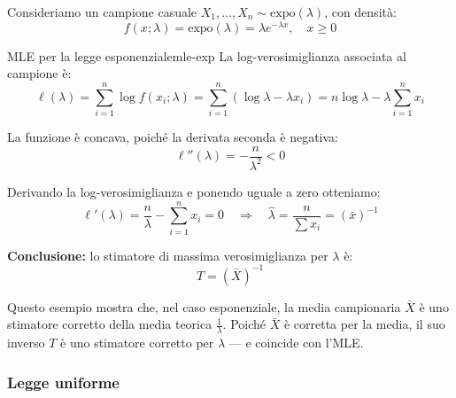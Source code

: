 Consideriamo un campione casuale \( X_1, \dots, X_n \sim \mathrm{expo}(\lambda) \), con densità:
\[
    f(x;\lambda) = \mathrm{expo}(\lambda) = \lambda e^{-\lambda x}, \quad x \geq 0
\]

\begin{esempio}{MLE per la legge esponenziale}{mle-exp}
La log-verosimiglianza associata al campione è:
\[
\ell(\lambda) = \sum_{i=1}^n \log f(x_i; \lambda) = \sum_{i=1}^n \left( \log \lambda - \lambda x_i \right)
= n \log \lambda - \lambda \sum_{i=1}^n x_i
\]

La funzione è concava, poiché la derivata seconda è negativa:
\[
\ell''(\lambda) = -\frac{n}{\lambda^2} < 0
\]

Derivando la log-verosimiglianza e ponendo uguale a zero otteniamo:
\[
\ell'(\lambda) = \frac{n}{\lambda} - \sum_{i=1}^n x_i = 0
\quad \Rightarrow \quad
\hat{\lambda} = \frac{n}{\sum x_i} = \left( \bar{x} \right)^{-1}
\]

\medskip
\textbf{Conclusione:} lo stimatore di massima verosimiglianza per \( \lambda \) è:
\[
T = \left( \bar{X} \right)^{-1}
\]

Questo esempio mostra che, nel caso esponenziale, la media campionaria \( \bar{X} \) è uno stimatore corretto della media teorica \( \frac{1}{\lambda} \). Poiché \( \bar{X} \) è corretta per la media, il suo inverso \( T \) è uno stimatore corretto per \( \lambda \) — e coincide con l’MLE.
\end{esempio}

\subsubsection{Legge uniforme}

